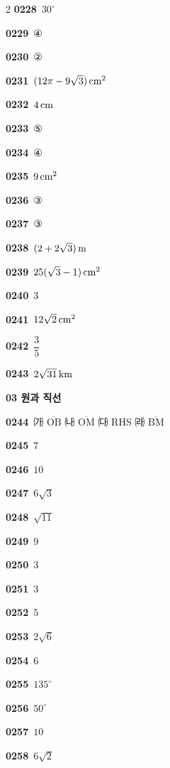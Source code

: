 \documentclass[10pt,a4paper]{article}
\newcommand{\seg}[1]{\overline{\mathrm{#1}}}
\begin{document}
\begin{multicols}{2}
\noindent\textbf{0228}\ $30^\circ$\par
\noindent\textbf{0229}\ ④\par
\noindent\textbf{0230}\ ②\par
\noindent\textbf{0231}\ $(12\pi-9\sqrt{3})\mkern3mu \mathrm{cm}^2$\par
\noindent\textbf{0232}\ $4\mkern3mu \mathrm{cm}$\par
\noindent\textbf{0233}\ ⑤\par
\noindent\textbf{0234}\ ④\par
\noindent\textbf{0235}\ $9\mkern3mu \mathrm{cm}^2$\par
\noindent\textbf{0236}\ ③\par
\noindent\textbf{0237}\ ③\par
\noindent\textbf{0238}\ $(2+2\sqrt{3})\mkern3mu \mathrm{m}$\par
\noindent\textbf{0239}\ $25(\sqrt{3}-1)\mkern3mu \mathrm{cm}^2$\par
\noindent\textbf{0240}\ $3$\par
\noindent\textbf{0241}\ $12\sqrt{2}\mkern3mu \mathrm{cm}^2$\par
\noindent\textbf{0242}\ $\dfrac{3}{5}$\par
\noindent\textbf{0243}\ $2\sqrt{31}\mkern3mu \mathrm{km}$\par
\noindent\textbf{03 원과 직선}\par\smallskip
\noindent\textbf{0244}\ ㈎ $\seg{OB}$ \quad ㈏ $\seg{OM}$ \quad ㈐ RHS \quad ㈑ $\seg{BM}$\par
\noindent\textbf{0245}\ $7$\par
\noindent\textbf{0246}\ $10$\par
\noindent\textbf{0247}\ $6\sqrt{3}$\par
\noindent\textbf{0248}\ $\sqrt{11}$\par
\noindent\textbf{0249}\ $9$\par
\noindent\textbf{0250}\ $3$\par
\noindent\textbf{0251}\ $3$\par
\noindent\textbf{0252}\ $5$\par
\noindent\textbf{0253}\ $2\sqrt{6}$\par
\noindent\textbf{0254}\ $6$\par
\noindent\textbf{0255}\ $135^\circ$\par
\noindent\textbf{0256}\ $50^\circ$\par
\noindent\textbf{0257}\ $10$\par
\noindent\textbf{0258}\ $6\sqrt{2}$\par

\end{multicols}
\end{document}
